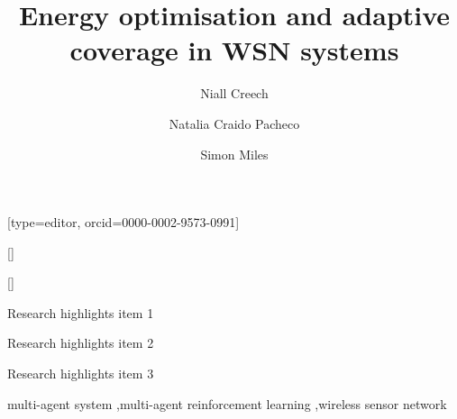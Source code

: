 \documentclass[a4paper,fleqn]{cas-sc}
\begin{document}
	\let\WriteBookmarks\relax
	\def\floatpagepagefraction{1}
	\def\textpagefraction{.001}
	
	\title [mode = title]{Energy optimisation and adaptive coverage in WSN systems}                      
	
	\author[1]{Niall Creech}[type=editor,	orcid=0000-0002-9573-0991]
	
	\author[2]{Natalia Craido Pacheco}[]

	\author[3]{Simon Miles}[]

	\address[1]{Department of Informatics, King's College London, Bush House, Strand Campus, 30, Aldwych, London WC2B 4BG}
	\address[2]{Department of Informatics, King's College London, Bush House, Strand Campus, 30, Aldwych, London WC2B 4BG}
	\address[3]{Department of Informatics, King's College London, Bush House, Strand Campus, 30, Aldwych, London WC2B 4BG}
	


	
	
	\begin{highlights}
		\item Research highlights item 1
		\item Research highlights item 2
		\item Research highlights item 3
	\end{highlights}
	
	\begin{keywords}
		multi-agent system
		\sep multi-agent reinforcement learning
		\sep wireless sensor network
	\end{keywords}

	
	
	\newtheorem{thm}{Theorem}

	\maketitle
	
	
	
	
	
	
	
	
	\begin{appendix}
	
	\end{appendix}
				
\end{document}
